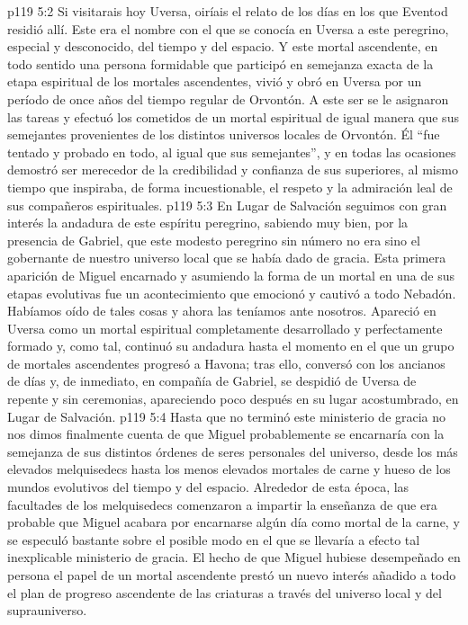 \vs p119 5:2 Si visitarais hoy Uversa, oiríais el relato de los días en los que Eventod residió allí. Este era el nombre con el que se conocía en Uversa a este peregrino, especial y desconocido, del tiempo y del espacio. Y este mortal ascendente, en todo sentido una persona formidable que participó en semejanza exacta de la etapa espiritual de los mortales ascendentes, vivió y obró en Uversa por un período de once años del tiempo regular de Orvontón. A este ser se le asignaron las tareas y efectuó los cometidos de un mortal espiritual de igual manera que sus semejantes provenientes de los distintos universos locales de Orvontón. Él “fue tentado y probado en todo, al igual que sus semejantes”, y en todas las ocasiones demostró ser merecedor de la credibilidad y confianza de sus superiores, al mismo tiempo que inspiraba, de forma incuestionable, el respeto y la admiración leal de sus compañeros espirituales.
\vs p119 5:3 En Lugar de Salvación seguimos con gran interés la andadura de este espíritu peregrino, sabiendo muy bien, por la presencia de Gabriel, que este modesto peregrino sin número no era sino el gobernante de nuestro universo local que se había dado de gracia. Esta primera aparición de Miguel encarnado y asumiendo la forma de un mortal en una de sus etapas evolutivas fue un acontecimiento que emocionó y cautivó a todo Nebadón. Habíamos oído de tales cosas y ahora las teníamos ante nosotros. Apareció en Uversa como un mortal espiritual completamente desarrollado y perfectamente formado y, como tal, continuó su andadura hasta el momento en el que un grupo de mortales ascendentes progresó a Havona; tras ello, conversó con los ancianos de días y, de inmediato, en compañía de Gabriel, se despidió de Uversa de repente y sin ceremonias, apareciendo poco después en su lugar acostumbrado, en Lugar de Salvación.
\vs p119 5:4 \pc Hasta que no terminó este ministerio de gracia no nos dimos finalmente cuenta de que Miguel probablemente se encarnaría con la semejanza de sus distintos órdenes de seres personales del universo, desde los más elevados melquisedecs hasta los menos elevados mortales de carne y hueso de los mundos evolutivos del tiempo y del espacio. Alrededor de esta época, las facultades de los melquisedecs comenzaron a impartir la enseñanza de que era probable que Miguel acabara por encarnarse algún día como mortal de la carne, y se especuló bastante sobre el posible modo en el que se llevaría a efecto tal inexplicable ministerio de gracia. El hecho de que Miguel hubiese desempeñado en persona el papel de un mortal ascendente prestó un nuevo interés añadido a todo el plan de progreso ascendente de las criaturas a través del universo local y del suprauniverso.
